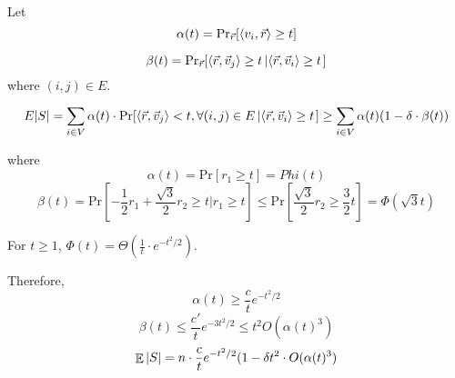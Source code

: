 Let \[ \alpha(t)=\displaystyle\mathrm{Pr}_{\vec{r}}[\left<v_i,\vec{r}\right> \geq t] \]

\[\beta(t)=\mathrm{Pr}_{\vec{r}}[\left<\vec{r},\vec{v}_j\right> \geq t\left|\left<\vec{r},\vec{v}_i\right> \geq t\right.] \]
where  $ (i,j)\in E $.

\[E|S|=\sum_{i\in V}\alpha(t)\cdot \mathrm{Pr}[\left<\vec{r},\vec{v}_j\right><t,\forall (i,j)\in E\left|\left<\vec{r},\vec{v}_i\right> \geq t\right.] \geq \sum_{i\in V}\alpha(t)(1-\delta\cdot \beta(t))\]

where 
\[\alpha(t)=\mathrm{Pr}[r_1 \geq t]=Phi(t)\]
\[\beta(t)=\mathrm{Pr}[-\frac{1}{2}r_1+\frac{\sqrt{3}}{2}r_2 \geq t|r_1 \geq t] \leq \mathrm{Pr}[\frac{\sqrt{3}}{2}r_2 \geq \frac{3}{2}t]=\Phi(\sqrt{3}t)\]

\begin{claim}
    For  $ t \geq 1 $,  $ \Phi(t)=\Theta(\frac{1}{t}\cdot e^{-t^2/2}) $.
    
\end{claim}

Therefore,
    \[\alpha(t) \geq \frac{c}{t}e^{-t^2/2}\]
    \[\beta(t) \leq \frac{c'}{t}e^{-3t^2/2} \leq t^2O(\alpha(t)^3)\]
    \[\mathop\mathbb E|S|=n\cdot \frac{c}{t}e^{-t^2/2}(1-\delta t^2\cdot O(\alpha(t)^3)\]

